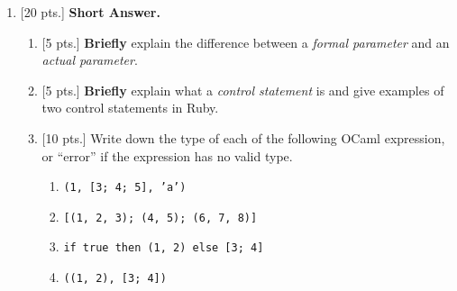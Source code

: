 \documentclass[11pt]{article}
\begin{document}
  \begin{enumerate}


    \item {[20 pts.]} \textbf{Short Answer.}

          \vspace{-1.5mm}

          \begin{enumerate}

            \item { [5 pts.]} \textbf{Briefly} explain the difference
                  between a \textit{formal parameter} and an \textit{actual
                  parameter}.

                  \vspace{1.65in}

            \item { [5 pts.]} \textbf{Briefly} explain what a
                  \textit{control statement} is and give examples of two
                  control statements in Ruby.

                  \vspace{1.65in}

            \item { [10 pts.]} Write down the type of each of the following
                  OCaml expression, or ``error'' if the expression has no
                  valid type.

                  \begin{enumerate}

                    \item \texttt{(1, [3; 4; 5], 'a')}

                          \vspace{.65in}

                    \item \texttt{[(1, 2, 3); (4, 5); (6, 7, 8)]}

                          \vspace{.65in}

                    \item \texttt{if true then (1, 2) else [3; 4]}

                          \vspace{.65in}

                    \item \texttt{((1, 2), [3; 4])}


\end{enumerate}
\end{enumerate}
\end{enumerate}
\end{document}
